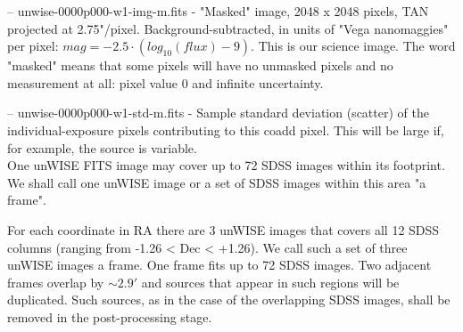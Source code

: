 -- unwise-0000p000-w1-img-m.fits - "Masked" image, 2048 x 2048 pixels, TAN projected at 2.75"/pixel. Background-subtracted, in units of "Vega nanomaggies" per pixel: $mag = -2.5 \cdot (log_{10}(flux) - 9)$. This is our science image. The word "masked" means that some pixels will have no unmasked pixels and no measurement at all: pixel value 0 and infinite uncertainty.

-- unwise-0000p000-w1-std-m.fits - Sample standard deviation (scatter) of the individual-exposure pixels  contributing to this coadd pixel. This will be large if, for example, the source is variable.\\

One unWISE FITS image may cover up to 72 SDSS images within its footprint. We shall call one unWISE image or a set of SDSS images within this area "a frame".

For each coordinate in RA there are 3 unWISE images that covers all 12 SDSS columns (ranging from -1.26 < Dec < +1.26). We call such a set of three unWISE images a frame. One frame fits up to 72 SDSS images. Two adjacent frames overlap by $\sim2.9'$ and sources that appear in such regions will be duplicated. Such sources, as in the case of the overlapping SDSS images, shall be removed in the post-processing stage.


